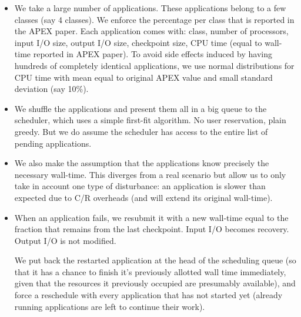 \begin{itemize}
\item We take a large number of applications. These applications belong to a few
  classes (say 4 classes). We enforce the percentage per class that is reported in
  the APEX paper.  Each application comes with: class, number of processors, input
  I/O size, output I/O size, checkpoint size, CPU time (equal to wall-time reported
  in APEX paper). To avoid side effects induced by having hundreds of completely
  identical applications, we use normal distributions for CPU time with mean equal to
  original APEX value and small standard deviation (say 10\%). 
  \item We shuffle the applications and present them all in a big queue to the scheduler,
  which uses a simple first-fit algorithm. No user reservation, plain greedy. But we do assume the scheduler has access to the entire list of pending applications.
\item We also make the assumption that the applications know precisely
  the necessary wall-time. This diverges from a real scenario but
  allow us to only take in account one type of disturbance: an
  application is slower than expected due to C/R overheads (and will
  extend its original wall-time). 
  \item When an application fails, we resubmit it with a new wall-time equal to the fraction that remains from the last checkpoint.  Input I/O becomes recovery. Output I/O is not modified.

We put back the restarted application at the head of the scheduling queue
  (so that it has a chance to finish it's previously allotted wall time
  immediately, given that the resources it previously occupied are
  presumably available), and force a reschedule with every application that
  has not started yet (already running applications are left to continue
  their work).
\end{itemize}

